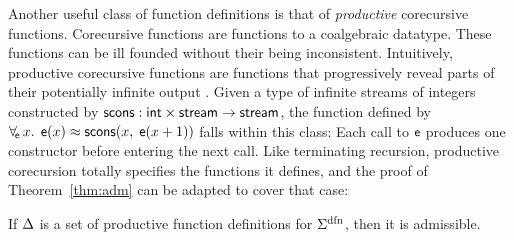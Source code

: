 
Another useful class of function definitions is that of
\emph{productive} corecursive functions. Corecursive functions are functions to
a coalgebraic datatype. These functions can be ill founded without
their being inconsistent. 
Intuitively, productive corecursive functions are functions that
progressively reveal parts of their potentially infinite
output \cite{turner-1995,mcbride-productive}.
Given a type of infinite streams of integers constructed by
$\mathsf{scons} : \mathsf{int} \times \mathsf{stream} \to\allowbreak \mathsf{stream}$,
the function defined by
$\forall_{\!\mathsf{e}\:} x.\;\, \mathsf{e}(x) \approx \mathsf{scons}(x,\; \mathsf{e}(x + 1))$
falls within this class: Each call to $\mathsf{e}$ produces one
constructor before entering the next call. Like terminating recursion,
productive corecursion totally specifies the functions it defines,
and the proof of Theorem~\ref{thm:adm} can be adapted to cover that case:

\begin{theorem}\label{thm:adm-co}
If $\DDD$ is a set of productive function definitions for\/
$\sfundefs{\Sigma}$, then it is admissible.
\end{theorem}


\newcommand\badassex{
 \{\forallf{\con{f}} x : \typeint.\;\, \con{f}( x ) \teq \con{f}( x ),\allowbreak\;\,
 \forallf{\con{g}} x : \typeint.\;\, \con{g}( x ) \teq \con{g}( x ) + \nobreak\con{f}( x )\}}

